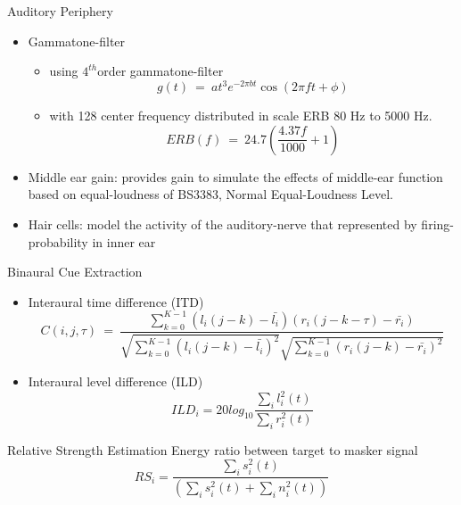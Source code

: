 \begin{frame}[t]{Auditory Periphery}
\begin{itemize}
\item Gammatone-filter
	\begin{itemize}
	\item using $4^{th}$order gammatone-filter
	\begin{equation}\label{pers:gammatone}
	g(t) ~=~ at^{3}e^{-2\pi bt}\cos(2 \pi ft + \phi)
	\end{equation}
	\item with 128 center frequency distributed in scale ERB 80 Hz to 5000 Hz.
	\begin{equation}\label{pers:erb}
	ERB(f) ~=~ 24.7 \left( \frac{4.37 f}{1000} + 1\right)
	\end{equation}
	\end{itemize}
\item Middle ear gain: provides gain to simulate the effects of middle-ear function based on equal-loudness of BS3383, Normal Equal-Loudness Level.
\item Hair cells: model the activity of the auditory-nerve that represented by firing-probability in inner ear
\end{itemize}
\end{frame}

\begin{frame}[t]{Binaural Cue Extraction}
\begin{itemize}
\item Interaural time difference (ITD)
\begin{equation}\label{pers:itd}
C(i, j, \tau) ~=~ \frac{\sum_{k=0}^{K-1}(l_i(j-k)-\bar{l_i})(r_i(j-k-\tau)-\bar{r_i})}{\sqrt{\sum_{k=0}^{K-1}(l_i(j-k)-\bar{l_i})^2}\sqrt{\sum_{k=0}^{K-1}(r_i(j-k)-\bar{r_i})^2}}
\end{equation}
\item Interaural level difference (ILD)
\begin{equation}\label{pers:ild}
ILD_i = 20log_{10}\frac{\sum_i l_i^2(t)}{\sum_i r_i^2(t)}
\end{equation}
\end{itemize}
\end{frame}

\begin{frame}[t]{Relative Strength Estimation}
Energy ratio between target to masker signal
\begin{equation}
RS_i = \frac{\sum_i s_i^2(t)}{\left(\sum_i s_i^2(t) + \sum_i n_i^2(t)\right)}
\end{equation}
\end{frame}

